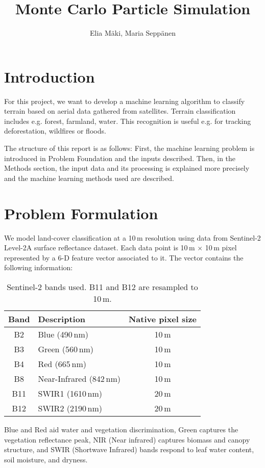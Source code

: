 \documentclass{article}
\title{Monte Carlo Particle Simulation}
\author{Elia Mäki, Maria Seppänen }
\begin{document}
\maketitle
\section{Introduction}
For this project, we want to develop a machine learning algorithm to classify terrain based on aerial data gathered from satellites. Terrain classification includes e.g. forest, farmland, water. This recognition is useful e.g. for tracking deforestation, wildfires or floods.

The structure of this report is as follows: First, the machine learning problem is introduced in Problem Foundation and the inputs described. Then, in the Methods section, the input data and its processing is explained more precisely and the machine learning methods used are described.  

\section{Problem Formulation}
We model land-cover classification at a 10\,m resolution using data from Sentinel-2 Level-2A surface reflectance dataset. Each data point is 10\,m $\times$ 10\,m pixel represented by a 6-D feature vector associated to it. The vector contains the following information:

\begin{table}[h]
    \centering
    \begin{tabular}{|c|l|c|}\hline
Band & Description & Native pixel size \\\hline
B2   & Blue (490\,nm) & 10\,m \\\hline
B3   & Green (560\,nm) & 10\,m \\\hline
B4   & Red (665\,nm) & 10\,m \\\hline
B8   & Near-Infrared (842\,nm) & 10\,m \\\hline
B11  & SWIR1 (1610\,nm) & 20\,m \\\hline
B12  & SWIR2 (2190\,nm) & 20\,m \\\hline
    \end{tabular}
    \caption{Sentinel-2 bands used. B11 and B12 are resampled to 10\,m.}
    \label{tab:s2bands}
\end{table}

Blue and Red aid water and vegetation discrimination, Green captures the vegetation reflectance peak,
NIR (Near infrared) captures biomass and canopy structure, and SWIR (Shortwave Infrared) bands respond to leaf water content, soil moisture, and dryness.
\end{document}
